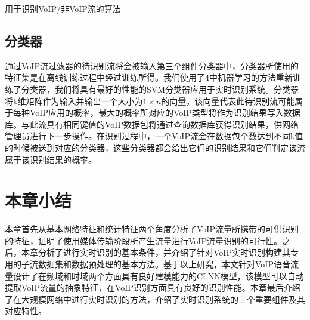 

\begin{algorithm}[h]
\caption{用于识别VoIP/非VoIP流的算法}
\label{algorithm:filter}
\end{algorithm}

\subsection{分类器}
通过VoIP流过滤器的待识别流将会被输入第三个组件分类器中，分类器所使用的特征集是在离线训练过程中经过训练所得。我们使用了4中机器学习的方法重新训练了分类器，我们将具有最好的性能的SVM分类器应用于实时识别系统。分类器将k维矩阵作为输入并输出一个大小为$1 \times n$的向量，该向量代表此待识别流可能属于每种VoIP应用的概率，最大的概率所对应的VoIP类型将作为识别结果写入数据库。与此流具有相同键值的VoIP数据包将通过查询数据库获得识别结果，供网络管理员进行下一步操作。在识别过程中，一个VoIP流会在数据包个数达到不同k值的时候被送到对应的分类器，这些分类器都会给出它们的识别结果和它们判定该流属于该识别结果的概率。

\section{本章小结}
本章首先从基本网络特征和统计特征两个角度分析了VoIP流量所携带的可供识别的特征，证明了使用媒体传输阶段所产生流量进行VoIP流量识别的可行性。之后，本章分析了进行实时识别的基本条件，并介绍了针对VoIP实时识别构建其专用的子流数据集和数据预处理的基本方法。基于以上研究，本文针对VoIP语音流量设计了在频域和时域两个方面具有良好建模能力的CLNN模型，该模型可以自动提取VoIP流量的抽象特征，在VoIP识别方面具有良好的识别性能。本章最后介绍了在大规模网络中进行实时识别的方法，介绍了实时识别系统的三个重要组件及其对应特性。
















